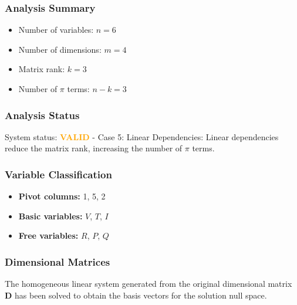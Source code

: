 \subsubsection*{Analysis Summary}
\begin{itemize}
\item Number of variables: $n = 6$
\item Number of dimensions: $m = 4$
\item Matrix rank: $k = 3$
\item Number of $\pi$ terms: $n - k = 3$
\end{itemize}

\subsubsection*{Analysis Status}
System status: \textcolor{orange}{\textbf{VALID}} - Case 5: Linear Dependencies: Linear dependencies reduce the matrix rank, increasing the number of $\pi$ terms.

\subsubsection*{Variable Classification}
\begin{itemize}
\item \textbf{Pivot columns:} 1, 5, 2
\item \textbf{Basic variables:} $V$, $T$, $I$
\item \textbf{Free variables:} $R$, $P$, $Q$
\end{itemize}

\subsubsection*{Dimensional Matrices}
The homogeneous linear system generated from the original dimensional matrix $\mathbf{D}$ has been solved to obtain the basis vectors for the solution null space.

